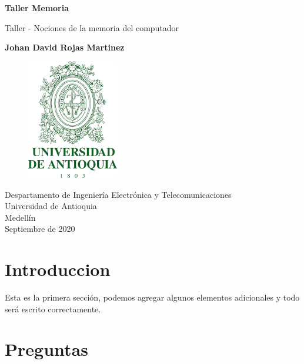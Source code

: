 \documentclass{article}
\begin{document}
\begin{titlepage}
    \begin{center}
        \vspace*{1cm}
            
        \Huge
        \textbf{Taller Memoria}
            
        \vspace{0.5cm}
        \LARGE
        Taller - Nociones de la memoria del computador
            
        \vspace{1.5cm}
            
        \textbf{Johan David Rojas Martinez}
            
        \vfill
            
        \vspace{0.8cm}
       
        \Large
\begin{figure}[h]
\includegraphics[width=4cm]{logoudea.png}
\centering
\end{figure}

        \vfill
        Despartamento de Ingeniería Electrónica y Telecomunicaciones\\
        Universidad de Antioquia\\
        Medellín\\
        Septiembre de 2020
                 
    \end{center}
\end{titlepage}

\tableofcontents

\section{Introduccion}
Esta es la primera sección, podemos agregar algunos elementos adicionales y todo será escrito correctamente. 

\section{Preguntas} \label{contenido}
\end{document}

